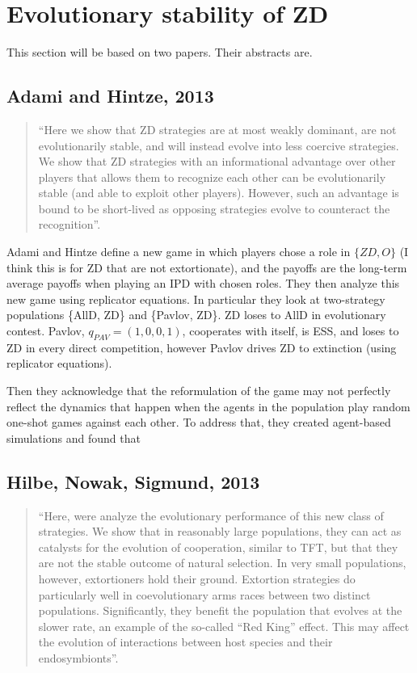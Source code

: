 \section{Evolutionary stability of ZD}
This section will be based on two papers. Their abstracts are.
\subsection{Adami and Hintze, 2013}
\begin{quote}``Here we show that ZD strategies are at most weakly dominant, are not evolutionarily stable, and will instead evolve into less coercive strategies. We show that ZD strategies with an informational advantage over other players that allows them to recognize each other can be evolutionarily stable (and able to exploit other players). However, such an advantage is bound to be short-lived as opposing strategies evolve to counteract the recognition''.
\end{quote}

Adami and Hintze define a new game in which players chose a role in $\{ZD, O\}$ (I think this is for ZD that are not extortionate), and the payoffs are the long-term average payoffs when playing an IPD with chosen roles. They then analyze this new game using replicator equations. In particular they look at two-strategy populations \{AllD, ZD\} and \{Pavlov, ZD\}. ZD loses to AllD in evolutionary contest. Pavlov, $q_{PAV} = (1, 0, 0, 1)$, cooperates with itself, is ESS, and loses to ZD in every direct competition, however Pavlov drives ZD to extinction (using replicator equations).

Then they acknowledge that the reformulation of the game may not perfectly reflect the dynamics that happen when the agents in the population play random one-shot games against each other. To address that, they created agent-based simulations and found that 


\subsection{Hilbe, Nowak, Sigmund, 2013}
\begin{quote}``Here, were analyze the evolutionary performance of this new class of strategies. We show that in reasonably large populations, they can act as catalysts for the evolution of cooperation, similar to TFT, but that they are not the stable outcome of natural selection. In very small populations, however, extortioners hold their ground. Extortion strategies do particularly well in coevolutionary arms races between two distinct populations. Significantly, they benefit the population that evolves at the slower rate, an example of the so-called ``Red King'' effect. This may affect the evolution of interactions between host species and their endosymbionts''.
\end{quote}

